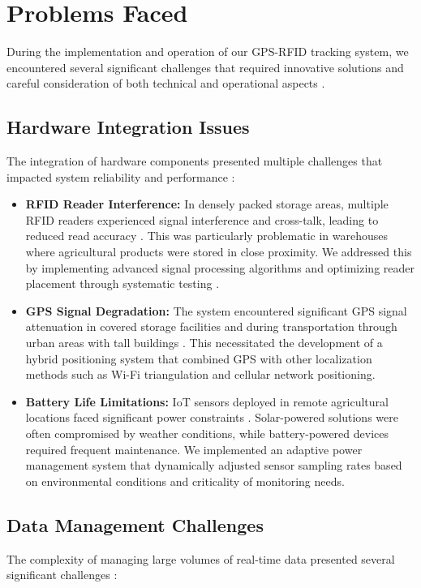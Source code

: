 \documentclass[conference]{IEEEtran}
\begin{document}
\section{Problems Faced}
During the implementation and operation of our GPS-RFID tracking system, we encountered several significant challenges that required innovative solutions and careful consideration of both technical and operational aspects \cite{visconti2020development}.

\subsection{Hardware Integration Issues}
The integration of hardware components presented multiple challenges that impacted system reliability and performance \cite{rayhana2021rfid}:

\begin{itemize}
    \item \textbf{RFID Reader Interference:} In densely packed storage areas, multiple RFID readers experienced signal interference and cross-talk, leading to reduced read accuracy \cite{elbeheiry2023technologies}. This was particularly problematic in warehouses where agricultural products were stored in close proximity. We addressed this by implementing advanced signal processing algorithms and optimizing reader placement through systematic testing \cite{xu2023novel}.
    
    \item \textbf{GPS Signal Degradation:} The system encountered significant GPS signal attenuation in covered storage facilities and during transportation through urban areas with tall buildings \cite{makario2021bluetooth}. This necessitated the development of a hybrid positioning system that combined GPS with other localization methods such as Wi-Fi triangulation and cellular network positioning.
    
    \item \textbf{Battery Life Limitations:} IoT sensors deployed in remote agricultural locations faced significant power constraints \cite{rosero2023smart}. Solar-powered solutions were often compromised by weather conditions, while battery-powered devices required frequent maintenance. We implemented an adaptive power management system that dynamically adjusted sensor sampling rates based on environmental conditions and criticality of monitoring needs.
\end{itemize}

\subsection{Data Management Challenges}
The complexity of managing large volumes of real-time data presented several significant challenges \cite{ahmed2024optimized}:
\end{document}
